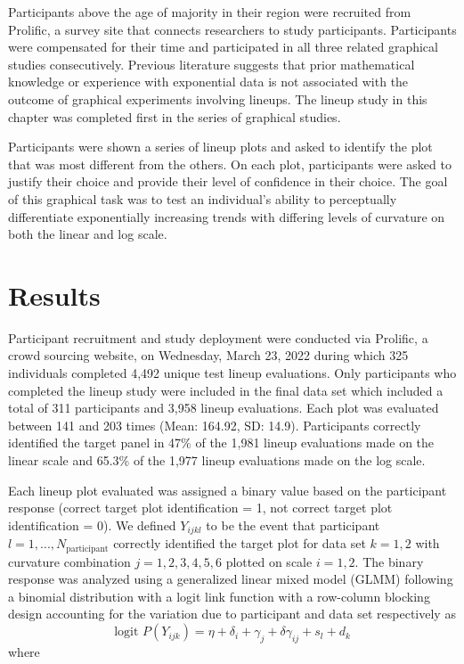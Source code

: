 \documentclass[12pt]{article}
\begin{document}
Participants above the age of majority in their region were recruited
from Prolific, a survey site that connects researchers to study
participants. Participants were compensated for their time and
participated in all three related graphical studies consecutively.
Previous literature suggests that prior mathematical knowledge or
experience with exponential data is not associated with the outcome of
graphical experiments involving lineups\citep{vanderplas2015spatial}.
The lineup study in this chapter was completed first in the series of
graphical studies.

Participants were shown a series of lineup plots and asked to identify
the plot that was most different from the others. On each plot,
participants were asked to justify their choice and provide their level
of confidence in their choice. The goal of this graphical task was to
test an individual's ability to perceptually differentiate exponentially
increasing trends with differing levels of curvature on both the linear
and log scale.

\hypertarget{results}{%
\section{Results}\label{results}}

Participant recruitment and study deployment were conducted via
Prolific, a crowd sourcing website, on Wednesday, March 23, 2022 during
which 325 individuals completed 4,492 unique test lineup evaluations.
Only participants who completed the lineup study were included in the
final data set which included a total of 311 participants and 3,958
lineup evaluations. Each plot was evaluated between 141 and 203 times
(Mean: 164.92, SD: 14.9). Participants correctly identified the target
panel in 47\% of the 1,981 lineup evaluations made on the linear scale
and 65.3\% of the 1,977 lineup evaluations made on the log scale.

Each lineup plot evaluated was assigned a binary value based on the
participant response (correct target plot identification = 1, not
correct target plot identification = 0). We defined \(Y_{ijkl}\) to be
the event that participant \(l = 1,...,N_\text{participant}\) correctly
identified the target plot for data set \(k = 1,2\) with curvature
combination \(j = 1,2,3,4,5,6\) plotted on scale \(i = 1,2\). The binary
response was analyzed using a generalized linear mixed model (GLMM)
following a binomial distribution with a logit link function with a
row-column blocking design accounting for the variation due to
participant and data set respectively as \begin{equation}
\text{logit }P(Y_{ijk}) = \eta + \delta_i + \gamma_j + \delta \gamma_{ij} + s_l + d_k
\end{equation} \noindent where
\end{document}

